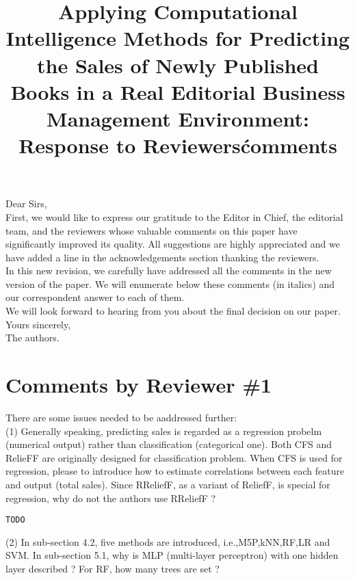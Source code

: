 \documentclass[preprint]{elsarticle}
\begin{document}

\title{Applying Computational Intelligence Methods for Predicting the Sales of Newly Published Books in a Real Editorial Business Management Environment: Response to Reviewers\' comments}

\noindent
Dear Sirs,\\

First, we would like to express our gratitude to the Editor in Chief, the editorial team, and the reviewers whose valuable comments on this paper have significantly improved its quality. All suggestions are highly appreciated and we have added a line in the acknowledgements section thanking the reviewers. \\

In this new revision, we carefully have addressed all the comments in the new version of the paper. We will enumerate below these comments (in italics) and our correspondent answer to each of them. \\

We will look forward to hearing from you about the final decision on our paper. \\

\noindent
Yours sincerely,\\
The authors.


\section{Comments by Reviewer \#1}

\noindent There are some issues needed to be aaddressed further: \\

\noindent (1) Generally speaking, predicting sales is regarded as a regression probelm (numerical output) rather than classification (categorical one). Both CFS and RelieFF are originally designed for classification problem. When CFS is used for regression, please to introduce how to estimate correlations between each feature and output (total sales). Since RReliefF, as a variant of ReliefF, is special for regression, why do not the authors use RReliefF ? \\

\begin{verbatim}
TODO
\end{verbatim}

\noindent (2) In sub-section 4.2, five methods are introduced, i.e.,M5P,kNN,RF,LR and SVM. In sub-section 5.1, why is MLP (multi-layer perceptron) with one hidden layer described ? For RF, how many trees are set ?\\
\end{document}
